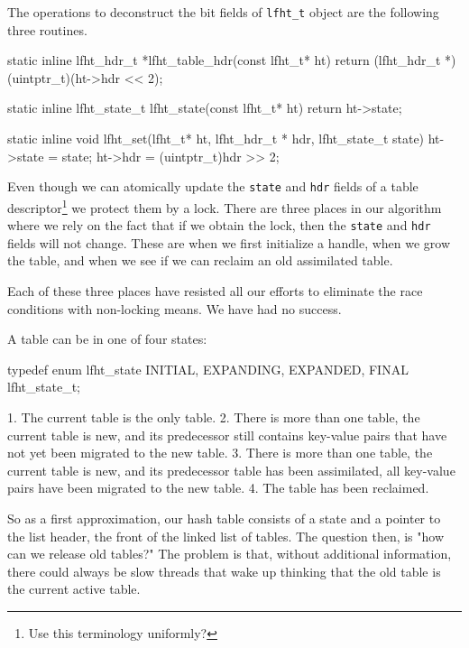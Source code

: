 The operations to deconstruct the bit fields of \texttt{lfht\_t} object are the following three
routines.
\begin{center}
\begin{clisting}
static inline lfht_hdr_t *lfht_table_hdr(const lfht_t* ht){
  return (lfht_hdr_t *)(uintptr_t)(ht->hdr << 2);
}

static inline lfht_state_t lfht_state(const lfht_t* ht){
  return ht->state;
}

static inline void lfht_set(lfht_t* ht, lfht_hdr_t * hdr, lfht_state_t state){
  ht->state = state;
  ht->hdr = (uintptr_t)hdr >> 2;
}
\end{clisting}
\end{center}


Even though we can atomically update the \texttt{state} and
\texttt{hdr} fields of a table descriptor\footnote{Use this
  terminology uniformly?}  we protect them by a lock. There are three
places in our algorithm where we rely on the fact that if we obtain
the lock, then the \texttt{state} and \texttt{hdr} fields will not
change.  These are when we first initialize a handle, when we grow the
table, and when we see if we can reclaim an old assimilated table.

Each of these three places have resisted all our efforts to eliminate the race conditions
with non-locking means. We have had no success.


A table can be in one of four states:

\begin{center}
\begin{clisting}
typedef enum lfht_state { INITIAL, EXPANDING, EXPANDED, FINAL } lfht_state_t;
\end{clisting}
\end{center}

1. The current table is the only table. 2. There is more than one table, the current table is new, and its
predecessor still contains key-value pairs that have not yet been
migrated to the new table. 3. There is more than one table, the current table is new, and its
predecessor table has been assimilated, all key-value pairs have been
migrated to the new table. 4. The table has been reclaimed.

So as a first approximation, our hash table consists of a state and a
pointer to the list header, the front of the linked list of tables.
The question then, is "how can we release old tables?" The problem is
that, without additional information, there could always be slow
threads that wake up thinking that the old table is the current active
table.

